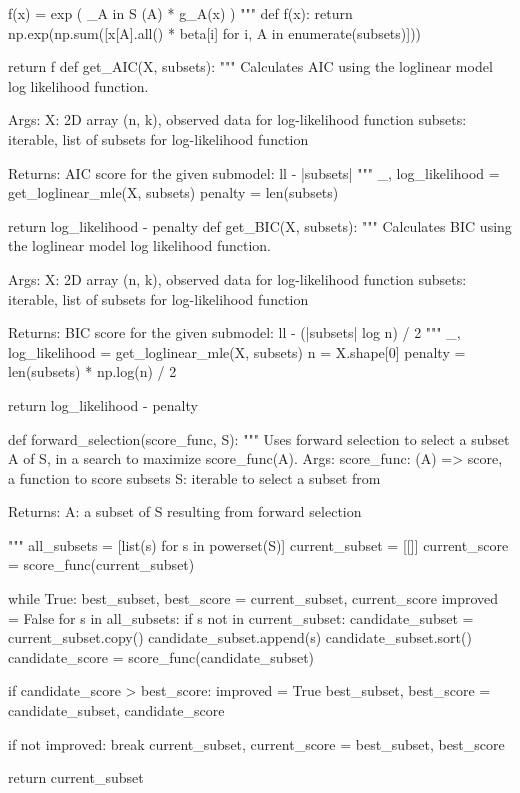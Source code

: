 \begin{python}
    f(x) = exp ( \sum_{A in S} \beta(A) * g_A(x) )
    """
    def f(x):
        return np.exp(np.sum([x[A].all() * beta[i] for i, A in enumerate(subsets)]))
    
    return f
def get_AIC(X, subsets):
    """ 
    Calculates AIC using the loglinear model log likelihood function.
    
    Args:
       X:        2D array (n, k), observed data for log-likelihood function
       subsets:  iterable, list of subsets for log-likelihood function
       
    Returns:
       AIC score for the given submodel:  ll - |subsets|
    """
    _, log_likelihood = get_loglinear_mle(X, subsets)
    penalty = len(subsets)
    
    return log_likelihood - penalty
def get_BIC(X, subsets):
    """ 
    Calculates BIC using the loglinear model log likelihood function.
    
    Args:
       X:        2D array (n, k), observed data for log-likelihood function
       subsets:  iterable, list of subsets for log-likelihood function
       
    Returns:
       BIC score for the given submodel:  ll - (|subsets| log n) / 2
    """
    _, log_likelihood = get_loglinear_mle(X, subsets)
    n = X.shape[0]
    penalty = len(subsets) * np.log(n) / 2
    
    return log_likelihood - penalty
\end{python}

\begin{python}
def forward_selection(score_func, S):
    """
    Uses forward selection to select a subset A of S, in a search to maximize score_func(A).
    Args:
       score_func:  (A) => score, a function to score subsets
       S:           iterable to select a subset from
       
    Returns:
       A:           a subset of S resulting from forward selection
       
    """
    all_subsets = [list(s) for s in powerset(S)]
    current_subset = [[]]
    current_score = score_func(current_subset)
    
    while True:
        best_subset, best_score = current_subset, current_score
        improved = False
        for s in all_subsets:
            if s not in current_subset:
                candidate_subset = current_subset.copy()
                candidate_subset.append(s)
                candidate_subset.sort()
                candidate_score = score_func(candidate_subset)
                
                if candidate_score > best_score:
                    improved = True
                    best_subset, best_score = candidate_subset, candidate_score
        
        if not improved:
            break
        current_subset, current_score = best_subset, best_score
    
    return current_subset
\end{python}

